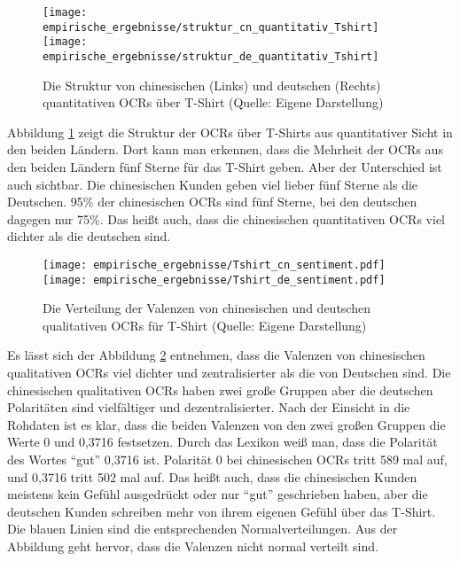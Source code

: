 \begin{figure}[htb]
    {\texttt{[image: empirische\_ergebnisse/struktur\_cn\_quantitativ\_Tshirt]}}    
    {\texttt{[image: empirische\_ergebnisse/struktur\_de\_quantitativ\_Tshirt]}}   
    \caption[Die Struktur von chinesischen und deutschen quantitativen OCRs über T-Shirt]{Die Struktur von chinesischen (Links) und deutschen (Rechts) quantitativen \ac{OCRs} über T-Shirt (Quelle: Eigene Darstellung)}
    \label{fig:struktur_quantitativ_Tshirt}
\end{figure}

Abbildung \ref{fig:struktur_quantitativ_Tshirt} zeigt die Struktur der \ac{OCRs} über T-Shirts aus quantitativer Sicht in den beiden Ländern. Dort kann man erkennen, dass die Mehrheit der \ac{OCRs} aus den beiden Ländern fünf Sterne für das T-Shirt geben. Aber der Unterschied ist auch sichtbar. Die chinesischen Kunden geben viel lieber fünf Sterne als die Deutschen. 95\% der chinesischen \ac{OCRs} sind fünf Sterne, bei den deutschen dagegen nur 75\%. Das heißt auch, dass die chinesischen quantitativen \ac{OCRs} viel dichter als die deutschen sind.

\begin{figure}[htb]
    \texttt{[image: empirische\_ergebnisse/Tshirt\_cn\_sentiment.pdf]}
    \endminipage\hfill
    \texttt{[image: empirische\_ergebnisse/Tshirt\_de\_sentiment.pdf]}
    \endminipage 
    \caption[Die Verteilung der Valenzen von chinesischen und deutschen qualitativen OCRs für T-Shirt]{Die Verteilung der Valenzen von chinesischen und deutschen qualitativen \ac{OCRs} für T-Shirt (Quelle: Eigene Darstellung)}
    \label{fig:valenz_Tshirt}
\end{figure}

Es lässt sich der Abbildung \ref{fig:valenz_Tshirt} entnehmen, dass die Valenzen von chinesischen qualitativen \ac{OCRs} viel dichter und zentralisierter als die von Deutschen sind. Die chinesischen qualitativen OCRs haben zwei große Gruppen aber die deutschen Polaritäten sind vielfältiger und dezentralisierter. Nach der Einsicht in die Rohdaten ist es klar, dass die beiden Valenzen von den zwei großen Gruppen die Werte 0 und 0,3716 festsetzen. Durch das Lexikon weiß man, dass die Polarität des Wortes “gut” 0,3716 ist. Polarität 0 bei chinesischen OCRs tritt 589 mal auf, und 0,3716 tritt 502 mal auf. Das heißt auch, dass die chinesischen Kunden meistens kein Gefühl ausgedrückt oder nur “gut” geschrieben haben, aber die deutschen Kunden schreiben mehr von ihrem eigenen Gefühl über das T-Shirt. Die blauen Linien sind die entsprechenden Normalverteilungen. Aus der Abbildung geht hervor, dass die Valenzen nicht normal verteilt sind.

